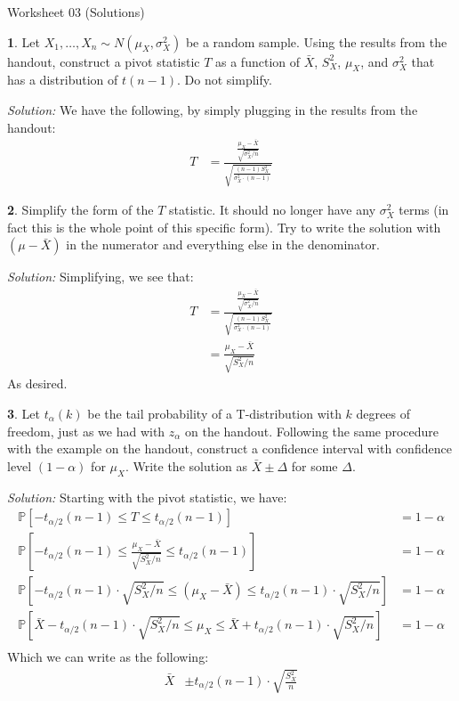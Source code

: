 \documentclass{tufte-handout}
\newcommand{\Prob}{\mathbb{P}}
\begin{document}
\justify

{\LARGE Worksheet 03 (Solutions)}

\vspace*{18pt}


\textbf{1}. Let $X_1, \ldots, X_n \sim N(\mu_X, \sigma_X^2)$ be a random sample. Using
the results from the handout, construct a pivot statistic $T$ as a function
of $\bar{X}$, $S_X^2$, $\mu_X$, and $\sigma_X^2$ that has a distribution of
$t(n-1)$. Do not simplify.

\textit{Solution:} We have the following, by simply plugging in the results from the handout:
\begin{align*}
T &= \frac{\frac{\mu_X - \bar{X}}{\sqrt{\sigma_X^2 / n}}}{\sqrt{\frac{(n-1)S^2_X}{\sigma_X^2 \cdot (n-1)}}}
\end{align*}

\textbf{2}. Simplify the form of the $T$ statistic. It should no longer have any
$\sigma_X^2$ terms (in fact this is the whole point of this specific form). 
Try to write the solution with $(\mu - \bar{X})$ in the numerator and
everything else in the denominator.

\textit{Solution:} Simplifying, we see that:
\begin{align*}
T &= \frac{\frac{\mu_X - \bar{X}}{\sqrt{\sigma_X^2 / n}}}{\sqrt{\frac{(n-1)S^2_X}{\sigma_X^2 \cdot (n-1)}}} \\
&= \frac{\mu_X - \bar{X}}{\sqrt{S^2_X / n}}
\end{align*}
As desired.

\textbf{3}. Let $t_\alpha(k)$ be the tail probability of a T-distribution with $k$
degrees of freedom, just as we had with $z_\alpha$ on the handout. Following
the same procedure with the example on the handout, construct a confidence
interval with confidence level $(1 - \alpha)$ for $\mu_X$. Write the solution
as $\bar{X} \pm \Delta$ for some $\Delta$.

\textit{Solution:} Starting with the pivot statistic, we have:
\begin{align*}
\Prob\left[ -t_{\alpha/2}(n-1) \leq T \leq t_{\alpha/2}(n-1) \right] &= 1 - \alpha \\
\Prob\left[ -t_{\alpha/2}(n-1) \leq \frac{\mu_X - \bar{X}}{\sqrt{S^2_X / n}} \leq t_{\alpha/2}(n-1) \right] &= 1 - \alpha \\
\Prob\left[ -t_{\alpha/2}(n-1) \cdot \sqrt{S^2_X / n} \leq (\mu_X - \bar{X}) \leq t_{\alpha/2}(n-1) \cdot \sqrt{S^2_X / n} \right] &= 1 - \alpha \\
\Prob\left[ \bar{X} - t_{\alpha/2}(n-1) \cdot \sqrt{S^2_X / n} \leq \mu_X \leq \bar{X} + t_{\alpha/2}(n-1) \cdot \sqrt{S^2_X / n} \right] &= 1 - \alpha \\
\end{align*}
Which we can write as the following:
\begin{align*}
\bar{X} &\pm t_{\alpha/2}(n-1) \cdot \sqrt{\frac{S^2_X}{n}}
\end{align*}
\end{document}
